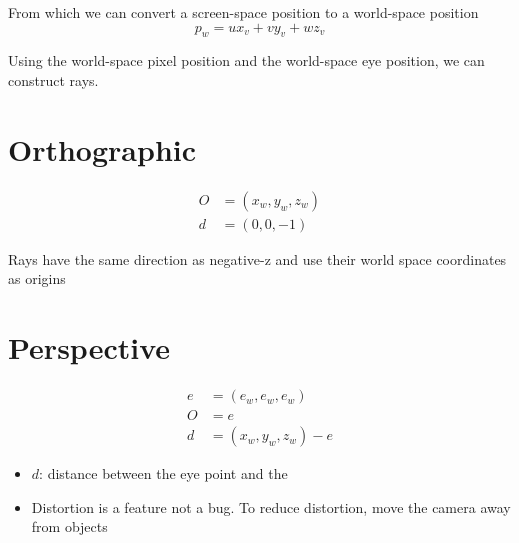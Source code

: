   From which we can convert a screen-space position to a world-space position
  \begin{equation}
    p_{w} = u x_{v} + v y_{v} + w z_{v}
  \end{equation}

  Using the world-space pixel position and the world-space eye position,
  we can construct rays.

\section{Orthographic}

  \begin{align}
    O &= \left( x_{w}, y_{w}, z_{w} \right) \\
    d &= \left( 0, 0, -1 \right)
  \end{align}

  Rays have the same direction as negative-z and use their world space
  coordinates as origins

\section{Perspective}

  \begin{align}
    e &= \left( e_{w}, e_{w}, e_{w} \right) \\
    O &= e  \\
    d &= \left( x_{w}, y_{w}, z_{w} \right) - e
  \end{align}

  \begin{itemize}
    \item $ d $: distance between the eye point and the 
    \item Distortion is a feature not a bug. To reduce distortion, move
    the camera away from objects
  \end{itemize}
